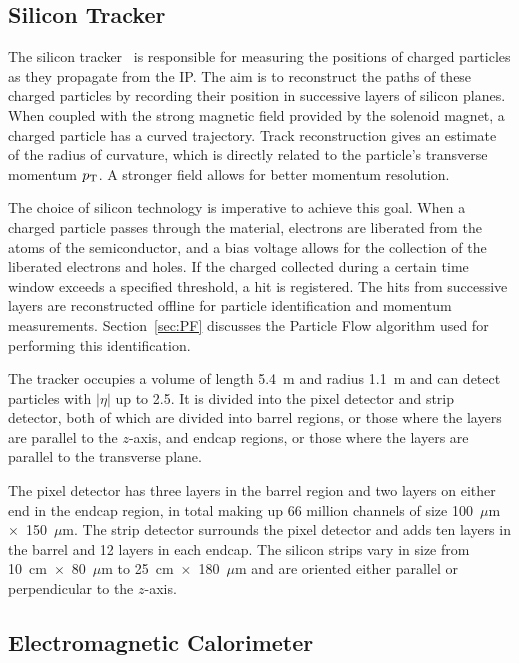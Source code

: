 \subsection{Silicon Tracker\label{subsec:tracker}}

The silicon tracker~\cite{Karimaki:368412} is responsible for measuring the positions of
charged particles as they propagate from the IP.
The aim is to reconstruct the paths of these charged particles by recording their position
in successive layers of silicon planes.
When coupled with the strong magnetic field provided by the solenoid
magnet, a charged particle has a curved trajectory. Track reconstruction gives an estimate of the
radius of curvature, which is directly related to the particle's transverse momentum $p_{\rm T}$.
A stronger field allows for better momentum resolution.

The choice of silicon technology is imperative to achieve this goal. When a charged particle passes through the material, electrons are liberated from the atoms of the semiconductor, and a bias voltage
allows for the collection of the liberated electrons and holes.
If the charged collected during
a certain time window exceeds a specified threshold, a hit is registered.
The hits from successive layers
are reconstructed offline for particle identification and momentum measurements.
Section~\ref{sec:PF} discusses the Particle Flow algorithm used for performing this identification.

The tracker occupies a volume
of length 5.4~m and radius 1.1~m and can detect particles with $|\eta|$ up to 2.5. It is divided into
the pixel detector and strip detector, both of which are divided into barrel regions, or those
where the layers are parallel to the $z$-axis, and endcap regions, or those where the layers
are parallel to the transverse plane.

The pixel detector has three layers in the barrel region
and two layers on either end in the endcap region, in total making up 66 million channels of size
100~$\mu$m~$\times$~150~$\mu$m. The strip detector surrounds the pixel detector and adds
ten layers in the barrel and 12 layers in each endcap. The silicon strips vary in size from
10~cm~$\times$~80~$\mu$m to 25~cm~$\times$~180~$\mu$m and are oriented either parallel or perpendicular
to the $z$-axis.

\subsection{Electromagnetic Calorimeter\label{subsec:ecal}}


